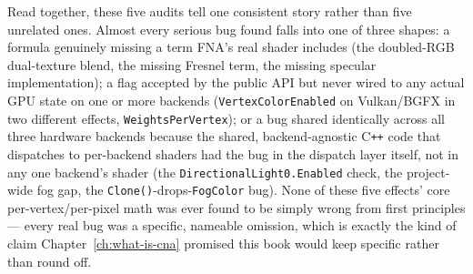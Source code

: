 Read together, these five audits tell one consistent story rather than five unrelated ones.
Almost every serious bug found falls into one of three shapes: a formula genuinely missing a
term FNA's real shader includes (the doubled-RGB dual-texture blend, the missing Fresnel
term, the missing specular implementation); a flag accepted by the public API but never
wired to any actual GPU state on one or more backends (\texttt{VertexColorEnabled} on
Vulkan/BGFX in two different effects, \texttt{WeightsPerVertex}); or a bug shared identically
across all three hardware backends because the shared, backend-agnostic C\texttt{++} code
that dispatches to per-backend shaders had the bug in the dispatch layer itself, not in any
one backend's shader (the \texttt{DirectionalLight0.Enabled} check, the project-wide fog
gap, the \texttt{Clone()}-drops-\texttt{FogColor} bug). None of these five effects' core
per-vertex/per-pixel math was ever found to be simply wrong from first principles --- every
real bug was a specific, nameable omission, which is exactly the kind of claim
Chapter~\ref{ch:what-is-cna} promised this book would keep specific rather than round off.
